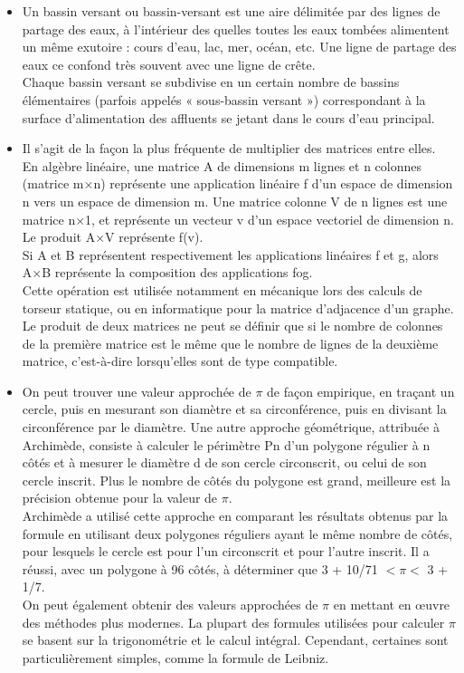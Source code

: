 \begin{itemize}

	\item Un bassin versant ou bassin-versant est une aire délimitée par des lignes de partage des eaux, à l'intérieur des quelles toutes les eaux tombées alimentent un même exutoire : cours d'eau, lac, mer, océan, etc. Une ligne de partage des eaux ce confond très souvent avec une ligne de crête.\\

	Chaque bassin versant se subdivise en un certain nombre de bassins élémentaires (parfois appelés « sous-bassin versant ») correspondant à la surface d'alimentation des affluents se jetant dans le cours d'eau principal.\\

	\item Il s'agit de la façon la plus fréquente de multiplier des matrices entre elles.\\
	En algèbre linéaire, une matrice A de dimensions m lignes et n colonnes (matrice m×n) représente une application linéaire f d'un espace de dimension n vers un espace de dimension m. Une matrice colonne V de n lignes est une matrice n×1, et représente un vecteur v d'un espace vectoriel de dimension n. Le produit A×V représente f(v).\\
	Si A et B représentent respectivement les applications linéaires f et g, alors A×B représente la composition des applications fog.\\
	Cette opération est utilisée notamment en mécanique lors des calculs de torseur statique, ou en informatique pour la matrice d'adjacence d'un graphe. \\
	Le produit de deux matrices ne peut se définir que si le nombre de colonnes de la première matrice est le même que le nombre de lignes de la deuxième matrice, c'est-à-dire lorsqu'elles sont de type compatible.

	\item  On peut trouver une valeur approchée de $\pi$ de façon empirique, en traçant un cercle, puis en mesurant son diamètre et sa circonférence, puis en divisant la circonférence par le diamètre. Une autre approche géométrique, attribuée à Archimède, consiste à calculer le périmètre Pn d’un polygone régulier à n côtés et à mesurer le diamètre d de son cercle circonscrit, ou celui de son cercle inscrit. Plus le nombre de côtés du polygone est grand, meilleure est la précision obtenue pour la valeur de $\pi$.\\
	Archimède a utilisé cette approche en comparant les résultats obtenus par la formule en utilisant deux polygones réguliers ayant le même nombre de côtés, pour lesquels le cercle est pour l’un circonscrit et pour l’autre inscrit. Il a réussi, avec un polygone à 96 côtés, à déterminer que 3 + 10/71 $< \pi <$ 3 + 1/7.\\
	On peut également obtenir des valeurs approchées de $\pi$ en mettant en œuvre des méthodes plus modernes. La plupart des formules utilisées pour calculer $\pi$ se basent sur la trigonométrie et le calcul intégral. Cependant, certaines sont particulièrement simples, comme la formule de Leibniz.


\end{itemize}
